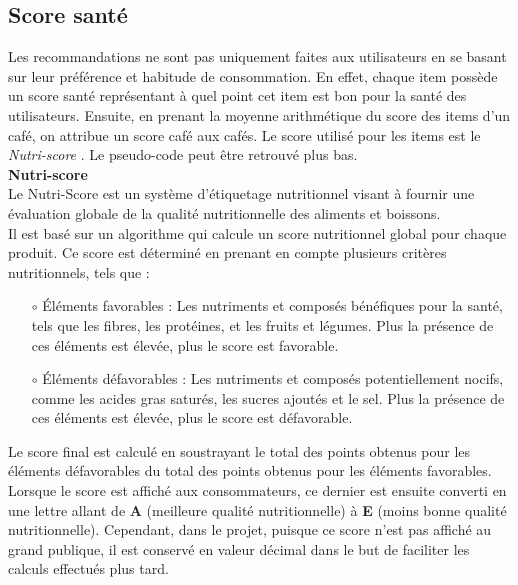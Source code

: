\documentclass[11pt]{article}
\begin{document}
\subsection{Score santé}
Les recommandations ne sont pas uniquement faites aux utilisateurs en se basant sur leur préférence et habitude de consommation. En effet, chaque item possède un score santé représentant à quel point cet item est bon pour la santé des utilisateurs. Ensuite, en prenant la moyenne arithmétique du score des items d'un café, on attribue un score café aux cafés. Le score utilisé pour les items est le \textit{Nutri-score} \cite{hercberg2021nutri}. Le pseudo-code peut être retrouvé plus bas.\\

\textbf{Nutri-score}\\

Le Nutri-Score est un système d'étiquetage nutritionnel visant à fournir une évaluation globale de la qualité nutritionnelle des aliments et boissons.\\

Il est basé sur un algorithme qui calcule un score nutritionnel global pour chaque produit. Ce score est déterminé en prenant en compte plusieurs critères nutritionnels, tels que :\\

\begin{itemize}
    \item[$\circ$] Éléments favorables : Les nutriments et composés bénéfiques pour la santé, tels que les fibres, les protéines, et les fruits et légumes. Plus la présence de ces éléments est élevée, plus le score est favorable.\\
    
    \item[$\circ$] Éléments défavorables : Les nutriments et composés potentiellement nocifs, comme les acides gras saturés, les sucres ajoutés et le sel. Plus la présence de ces éléments est élevée, plus le score est défavorable.\\
\end{itemize}

Le score final est calculé en soustrayant le total des points obtenus pour les éléments défavorables du total des points obtenus pour les éléments favorables. Lorsque le score est affiché aux consommateurs, ce dernier est ensuite converti en une lettre allant de \textbf{A} (meilleure qualité nutritionnelle) à \textbf{E} (moins bonne qualité nutritionnelle). Cependant, dans le projet, puisque ce score n'est pas affiché au grand publique, il est conservé en valeur décimal dans le but de faciliter les calculs effectués plus tard.\\
\end{document}
